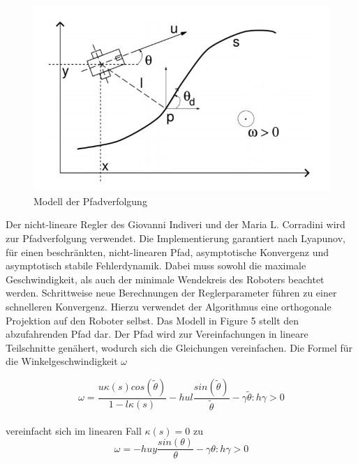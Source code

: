 \documentclass[11pt,a4paper]{article}
\begin{document}
{\begin{figure}[h]
	\includegraphics[width=\linewidth]{pictures/Pfadverfolgung.JPG}
	\caption{Modell der Pfadverfolgung}
\end{figure}

Der nicht-lineare Regler des Giovanni Indiveri und der Maria L. Corradini wird zur Pfadverfolgung verwendet. Die Implementierung garantiert nach Lyapunov, f\"ur einen beschr\"ankten, nicht-linearen Pfad, asymptotische Konvergenz und asymptotisch stabile Fehlerdynamik. Dabei muss sowohl die maximale Geschwindigkeit, als auch der minimale Wendekreis des Roboters beachtet werden. Schrittweise neue Berechnungen der Reglerparameter f\"uhren zu einer schnelleren Konvergenz. Hierzu verwendet der Algorithmus eine orthogonale Projektion auf den Roboter selbst. Das Modell in Figure 5 stellt den abzufahrenden Pfad dar. Der Pfad wird zur Vereinfachungen in lineare Teilschnitte gen\"ahert, wodurch sich die Gleichungen vereinfachen. Die Formel f\"ur die Winkelgeschwindigkeit $\omega$


\begin{equation}
 \omega=  \frac{u \kappa(s) cos(\tilde{\theta})}{1-l \kappa(s)}-h u l  \frac{sin(\tilde{\theta})}{\tilde{\theta}}-\gamma\tilde{\theta} :h\gamma > 0
\end{equation}\\

vereinfacht sich im linearen Fall $\kappa(s)=0$ zu \\

\begin{equation}
\omega= -h u y  \frac{sin(\theta)}{\theta}-\gamma\theta :h\gamma > 0
\end{equation}\\



}
\end{document}
